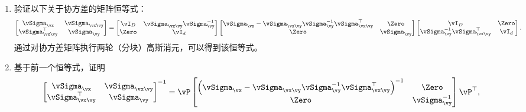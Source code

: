 \documentclass[../../book-main_zh.tex]{subfiles}
\begin{document}
\begin{exercise}
    \begin{enumerate}
        \item 验证以下关于协方差的矩阵恒等式：
            \begin{equation}\label{eq:gaussian-conditional-covariance-block}
                \begin{bmatrix}
                    \vSigma_{\vx} & \vSigma_{\vx\vy} \\
                    \vSigma_{\vx\vy}^\top & \vSigma_{\vy}
                \end{bmatrix}
                =
                \begin{bmatrix}
                    \vI_D & \vSigma_{\vx\vy}\vSigma_{\vy}^{-1} \\
                    \Zero & \vI_d
                \end{bmatrix}
                \begin{bmatrix}
                    \vSigma_{\vx} - \vSigma_{\vx\vy} \vSigma_{\vy}^{-1}
                    \vSigma_{\vx\vy}^{\top} & \Zero \\
                    \Zero & \vSigma_{\vy}
                \end{bmatrix}
                \begin{bmatrix}
                    \vI_D & \Zero\\
                    \vSigma_{\vy}^{-1}\vSigma_{\vx\vy}^\top & \vI_d
                \end{bmatrix}.
            \end{equation}
            通过对协方差矩阵执行两轮（分块）高斯消元，可以得到该恒等式。
        \item 基于前一个恒等式，证明
            \begin{equation}\label{eq:gaussian-conditional-covariance-inverse-block}
                \begin{bmatrix}
                    \vSigma_{\vx} & \vSigma_{\vx\vy} \\
                    \vSigma_{\vx\vy}^\top & \vSigma_{\vy}
                \end{bmatrix}^{-1}
                =
                \vP
                \begin{bmatrix}
                    \left(\vSigma_{\vx} - \vSigma_{\vx\vy}
                        \vSigma_{\vy}^{-1}
                    \vSigma_{\vx\vy}^{\top}\right)^{-1} & \Zero \\
                    \Zero & \vSigma_{\vy}^{-1}
                \end{bmatrix}
                \vP^\top,

\end{equation}
\end{enumerate}
\end{exercise}
\end{document}
